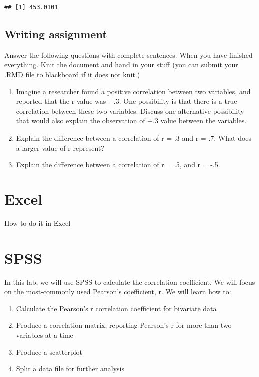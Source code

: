 \documentclass[
]{book}
\providecommand{\tightlist}{%
  \setlength{\itemsep}{0pt}\setlength{\parskip}{0pt}}
\begin{document}
\begin{verbatim}
## [1] 453.0101
\end{verbatim}

\hypertarget{writing-assignment-2}{%
\subsection{Writing assignment}\label{writing-assignment-2}}

Answer the following questions with complete sentences. When you have finished everything. Knit the document and hand in your stuff (you can submit your .RMD file to blackboard if it does not knit.)

\begin{enumerate}
\def\labelenumi{\arabic{enumi}.}
\item
  Imagine a researcher found a positive correlation between two variables, and reported that the r value was +.3. One possibility is that there is a true correlation between these two variables. Discuss one alternative possibility that would also explain the observation of +.3 value between the variables.
\item
  Explain the difference between a correlation of r = .3 and r = .7. What does a larger value of r represent?
\item
  Explain the difference between a correlation of r = .5, and r = -.5.
\end{enumerate}

\hypertarget{excel-3}{%
\section{Excel}\label{excel-3}}

How to do it in Excel

\hypertarget{spss-3}{%
\section{SPSS}\label{spss-3}}

In this lab, we will use SPSS to calculate the correlation coefficient. We will focus on the most-commonly used Pearson's coefficient, r. We will learn how to:

\begin{enumerate}
\def\labelenumi{\arabic{enumi}.}
\tightlist
\item
  Calculate the Pearson's r correlation coefficient for bivariate data
\item
  Produce a correlation matrix, reporting Pearson's r for more than two variables at a time
\item
  Produce a scatterplot
\item
  Split a data file for further analysis
\end{enumerate}
\end{document}
